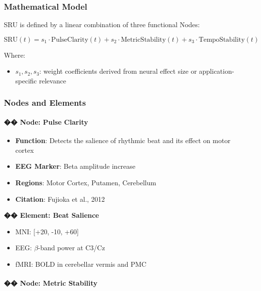 \subsubsection*{Mathematical Model}

SRU is defined by a linear combination of three functional Nodes:

\[
\text{SRU}(t) = s_1 \cdot \text{PulseClarity}(t) + s_2 \cdot \text{MetricStability}(t) + s_3 \cdot \text{TempoStability}(t)
\]

Where:

\begin{itemize}
    \item $s_1, s_2, s_3$: weight coefficients derived from neural effect size or application-specific relevance
\end{itemize}

\subsubsection*{Nodes and Elements}

\paragraph{�� Node: Pulse Clarity}

\begin{itemize}
    \item \textbf{Function}: Detects the salience of rhythmic beat and its effect on motor cortex
    \item \textbf{EEG Marker}: Beta amplitude increase
    \item \textbf{Regions}: Motor Cortex, Putamen, Cerebellum
    \item \textbf{Citation}: Fujioka et al., 2012
\end{itemize}

\textbf{�� Element: Beat Salience}

\begin{itemize}
    \item MNI: [+20, -10, +60]
    \item EEG: $\beta$-band power at C3/Cz
    \item fMRI: BOLD in cerebellar vermis and PMC
\end{itemize}

\paragraph{�� Node: Metric Stability}

